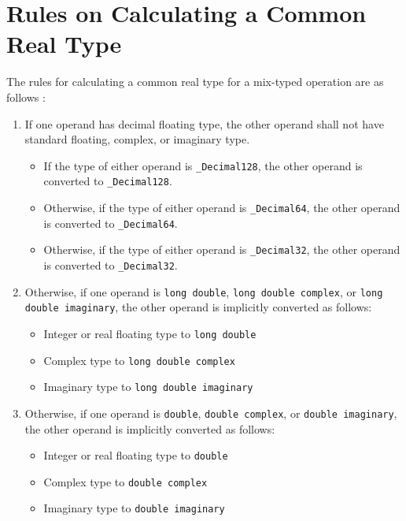 \chapter{Rules on Calculating a Common Real Type}
\label{appendix:common_real_type}

The rules for calculating a common real type for a mix-typed operation are as follows \cite{c_standard}:
\begin{enumerate}
    \item If one operand has decimal floating type, the other operand shall not have standard floating, complex, or imaginary type.
    \begin{itemize}
        \item If the type of either operand is \texttt{\_Decimal128}, the other operand is converted to \texttt{\_Decimal128}.
        \item Otherwise, if the type of either operand is \texttt{\_Decimal64}, the other operand is converted to \texttt{\_Decimal64}.
        \item Otherwise, if the type of either operand is \texttt{\_Decimal32}, the other operand is converted to \texttt{\_Decimal32}.
    \end{itemize}

    \item Otherwise, if one operand is \texttt{long double}, \texttt{long double complex}, or \texttt{long double imaginary}, the other operand is implicitly converted as follows:
    \begin{itemize}
        \item Integer or real floating type to \texttt{long double}
        \item Complex type to \texttt{long double complex}
        \item Imaginary type to \texttt{long double imaginary}
    \end{itemize}

    \item Otherwise, if one operand is \texttt{double}, \texttt{double complex}, or \texttt{double imaginary}, the other operand is implicitly converted as follows:
    \begin{itemize}
        \item Integer or real floating type to \texttt{double}
        \item Complex type to \texttt{double complex}
        \item Imaginary type to \texttt{double imaginary}
    \end{itemize}


\end{enumerate}

